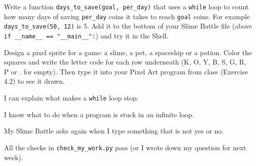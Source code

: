 \begin{challenge}
Write a function \texttt{days\_to\_save(goal, per\_day)} that uses a \texttt{while} loop to count how many days of saving
\texttt{per\_day} coins it takes to reach \texttt{goal} coins. For example \texttt{days\_to\_save(50, 12)} is 5. Add it to the bottom
of your Slime Battle file (above \texttt{if \_\_name\_\_ == "\_\_main\_\_":}) and try it in the Shell.
\end{challenge}

\begin{creative}
Design a pixel sprite for a game: a slime, a pet, a spaceship or a potion. Color the squares and write the letter code
for each row underneath (K, O, Y, B, S, G, R, P or . for empty). Then type it into your Pixel Art program from class
(Exercise 4.2) to see it drawn.
\begin{center}
\end{center}
\end{creative}

\begin{selfcheck}
  \item I can explain what makes a \texttt{while} loop stop.
  \item I know what to do when a program is stuck in an infinite loop.
  \item My Slime Battle asks again when I type something that is not yes or no.
  \item All the checks in \texttt{check\_my\_work.py} pass (or I wrote down my question for next week).
\end{selfcheck}
